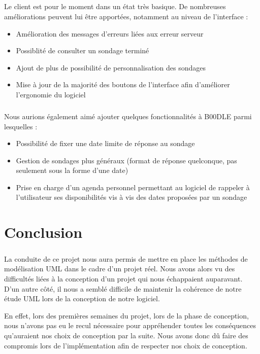 \documentclass[titlepage]{report}
\begin{document}
\paragraph{} Le client est pour le moment dans un état très basique. De nombreuses améliorations peuvent lui être apportées, notamment au niveau de l'interface : \begin{itemize}
	\item Amélioration des messages d'erreurs liées aux erreur serveur
	\item Possiblité de consulter un sondage terminé
	\item Ajout de plus de possibilité de personnalisation des sondages
	\item Mise à jour de la majorité des boutons de l'interface afin d'améliorer l'ergonomie du logiciel
\end{itemize}

\paragraph{} Nous aurions également aimé ajouter quelques fonctionnalités à B00DLE parmi lesquelles : \begin{itemize}
	\item Possibilité de fixer une date limite de réponse au sondage
	\item Gestion de sondages plus généraux (format de réponse quelconque, pas seulement sous la forme d'une date)
	\item Prise en charge d'un agenda personnel permettant au logiciel de rappeler à l'utilisateur ses disponibilités vis à vis des dates proposées par un sondage
\end{itemize}

\chapter{Conclusion}

\paragraph{} La conduite de ce projet nous aura permis de mettre en place les méthodes de modélisation UML dans le cadre d'un projet réel. Nous avons alors vu des difficultés liées à la conception d'un projet qui nous échappaient auparavant. D'un autre côté, il nous a semblé difficile de maintenir la cohérence de notre étude UML lors de la conception de notre logiciel.
\par En effet, lors des premières semaines du projet, lors de la phase de conception, nous n'avons pas eu le recul nécessaire pour appréhender toutes les conséquences qu'auraient nos choix de conception par la suite. Nous avons donc dû faire des compromis lors de l'implémentation afin de respecter nos choix de conception.
\end{document}
